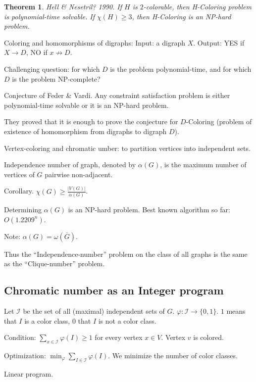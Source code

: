 \documentclass[12pt,a4paper]{article}
\newtheorem{theorem}{Theorem}
\begin{document}
\begin{theorem}
  Hell \& Nesetril? 1990.  If \(H\) is \(2\)-colorable, then H-Coloring problem
  is polynomial-time solvable.  If \(\chi(H) \geq 3\), then H-Coloring is an
  NP-hard problem.
\end{theorem}

Coloring and homomorphisms of digraphs:
Input: a digraph \(X\).
Output: YES if \(X \to D\), NO if \(x \not\to D\).

Challenging question: for which \(D\) is the problem polynomial-time, and for
which \(D\) is the problem NP-complete?

Conjecture of Feder \& Vardi. Any constraint satisfaction problem is either
polynomial-time solvable or it is an NP-hard problem.

They proved that it is enough to prove the conjecture for \(D\)-Coloring
(problem of existence of homomorphism from digraphs to digraph \(D\)).

Vertex-coloring and chromatic umber: to partition vertices into independent
sets.

Independence number of graph, denoted by \(\alpha(G)\), is the maximum number of
vertices of \(G\) pairwise non-adjacent.

Corollary. \(\chi(G) \geq \frac{|V(G)|}{\alpha(G)}\).

Determining \(\alpha(G)\) is an NP-hard problem.  Best known algorithm so far:
\(O(1.2209^n)\).

Note: \(\alpha(G) = \omega(\bar{G})\).

Thus the \enquote{Independence-number} problem on the class of all graphs is the
same as the \enquote{Clique-number} problem.

\subsection{Chromatic number as an Integer program}

Let \(\mathcal{I}\) be the set of all (maximal) independent sets of \(G\).
\(\varphi: \mathcal{I} \to \{0, 1\}\). \(1\) means that \(I\) is a color class,
\(0\) that \(I\) is not a color class.

Condition: \(\sum_{x \in \mathcal{I}} \varphi(I) \geq 1\) for every vertex \(x
\in V\).  Vertex \(v\) is colored.

Optimization: \(\min_{\varphi} \sum_{I \in \mathcal{I}} \varphi(I)\).  We
minimize the number of color classes.

Linear program.
\end{document}
